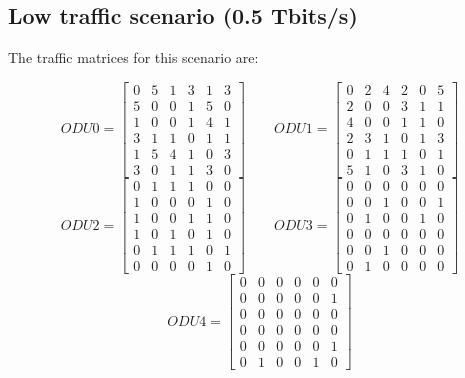\subsection{Low traffic scenario (0.5 Tbits/s)}\label{low_traffic_scenario}

The traffic matrices for this scenario are:

\[
ODU0=
  \begin{bmatrix}
    0 & 5 & 1 & 3 & 1 & 3 \\
    5 & 0 & 0 & 1 & 5 & 0 \\
    1 & 0 & 0 & 1 & 4 & 1 \\
    3 & 1 & 1 & 0 & 1 & 1 \\
    1 & 5 & 4 & 1 & 0 & 3 \\
    3 & 0 & 1 & 1 & 3 & 0
  \end{bmatrix}
\qquad ODU1=
  \begin{bmatrix}
    0 & 2 & 4 & 2 & 0 & 5 \\
    2 & 0 & 0 & 3 & 1 & 1 \\
    4 & 0 & 0 & 1 & 1 & 0 \\
    2 & 3 & 1 & 0 & 1 & 3 \\
    0 & 1 & 1 & 1 & 0 & 1 \\
    5 & 1 & 0 & 3 & 1 & 0
  \end{bmatrix}
\]
\[
ODU2=
  \begin{bmatrix}
    0 & 1 & 1 & 1 & 0 & 0 \\
    1 & 0 & 0 & 0 & 1 & 0 \\
    1 & 0 & 0 & 1 & 1 & 0 \\
    1 & 0 & 1 & 0 & 1 & 0 \\
    0 & 1 & 1 & 1 & 0 & 1 \\
    0 & 0 & 0 & 0 & 1 & 0
  \end{bmatrix}
\qquad ODU3=
  \begin{bmatrix}
    0 & 0 & 0 & 0 & 0 & 0 \\
    0 & 0 & 1 & 0 & 0 & 1 \\
    0 & 1 & 0 & 0 & 1 & 0 \\
    0 & 0 & 0 & 0 & 0 & 0 \\
    0 & 0 & 1 & 0 & 0 & 0 \\
    0 & 1 & 0 & 0 & 0 & 0
  \end{bmatrix}
\]
\[
ODU4=
  \begin{bmatrix}
    0 & 0 & 0 & 0 & 0 & 0 \\
    0 & 0 & 0 & 0 & 0 & 1 \\
    0 & 0 & 0 & 0 & 0 & 0 \\
    0 & 0 & 0 & 0 & 0 & 0 \\
    0 & 0 & 0 & 0 & 0 & 1 \\
    0 & 1 & 0 & 0 & 1 & 0
  \end{bmatrix}
\]

